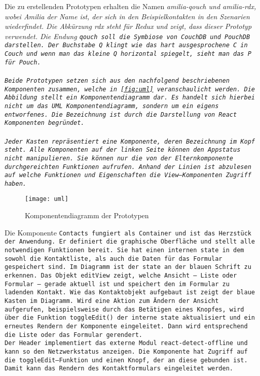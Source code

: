 Die zu erstellenden Prototypen erhalten die Namen \it{amilia-qouch} und \it{amilia-rdx}, wobei Amilia der Name ist, der sich in den Beispielkontakten in den Szenarien wiederfindet. Die Abkürzung \it{rdx} steht für Redux und zeigt, dass dieser Prototyp  verwendet. Die Endung \tt{qouch} soll die Symbiose von CouchDB und PouchDB darstellen. Der Buchstabe Q klingt wie das hart ausgesprochene C in Couch und wenn man das kleine Q horizontal spiegelt, sieht man das P für Pouch.\\\\
Beide Prototypen setzen sich aus den nachfolgend beschriebenen Komponenten zusammen, welche in \autoref{fig:uml} veranschaulicht werden. Die Abbildung stellt ein Komponentendiagramm dar. Es handelt sich hierbei nicht um das UML Komponentendiagramm, sondern um ein eigens entworfenes. Die Bezeichnung ist durch die Darstellung von React Komponenten begründet.\\\\
Jeder Kasten repräsentiert eine Komponente, deren Bezeichnung im Kopf steht.
Alle Komponenten auf der linken Seite können den Appstatus nicht manipulieren. Sie können nur die von der Elternkomponente durchgereichten Funktionen aufrufen. Anhand der Linien ist abzulesen auf welche Funktionen und Eigenschaften die View--Komponenten Zugriff haben.
%
\begin{figure}[H]
  \centering
  \texttt{[image: uml]}
  \grayRule
  \caption[Komponentendiagramm]{Komponentendiagramm der Prototypen}
  \label{fig:uml}
\end{figure}
%
Die Komponente \tt{Contacts} fungiert als Container und ist das Herzstück der Anwendung. Er definiert die graphische Oberfläche und stellt alle notwendigen Funktionen bereit. Sie hat einen internen \tt{state} in dem sowohl die Kontaktliste, als auch die Daten für das Formular gespeichert sind. Im Diagramm ist der \tt{state} an der blauen Schrift zu erkennen.
Das Objekt \tt{editView} zeigt, welche Ansicht -- Liste oder Formular -- gerade aktuell ist und speichert den im Formular zu ladenden Kontakt.
Wie das Kontaktobjekt aufgebaut ist zeigt der blaue Kasten im Diagramm.
Wird eine Aktion zum Ändern der Ansicht aufgerufen, beispielsweise durch das Betätigen eines Knopfes, wird über die Funktion \tt{toggleEdit()} der interne \tt{state} aktualisiert und ein erneutes Rendern der Komponente eingeleitet. Dann wird entsprechend die Liste oder das Formular gerendert.\\
%
Der \tt{Header} implementiert das externe Modul \tt{react-detect-offline} und kann so den Netzwerkstatus anzeigen. Die Komponente hat Zugriff auf die \tt{toggleEdit}--Funktion und einen Knopf, der an diese gebunden ist. Damit kann das Rendern des Kontaktformulars eingeleitet werden.
